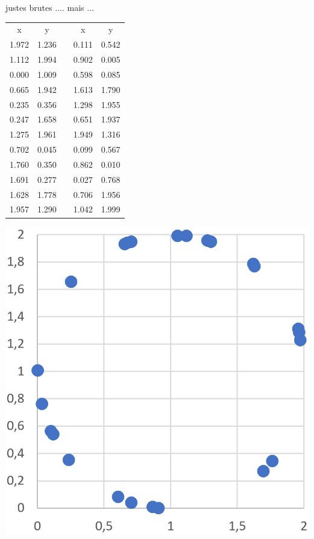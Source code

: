 \documentclass[french]{beamer}
\begin{document}
 \begin{frame}{justes brutes .... mais ... }
\begin{minipage}{.49\textwidth}
\begin{center}
	\begin{tabular}{|cc|c|cc|}
		x & y  &  & x & y \\ 
		1.972&1.236&&0.111&0.542 \\
		1.112&1.994&&0.902&0.005 \\
		0.000&1.009&&0.598&0.085 \\
		0.665&1.942&&1.613&1.790 \\
		0.235&0.356&&1.298&1.955 \\
		0.247&1.658&&0.651&1.937 \\
		1.275&1.961&&1.949&1.316 \\
		0.702&0.045&&0.099&0.567 \\
		1.760&0.350&&0.862&0.010 \\
		1.691&0.277&&0.027&0.768 \\
		1.628&1.778&&0.706&1.956 \\
		1.957&1.290&&1.042&1.999 \\
	\end{tabular} 
\end{center}
\end{minipage}\hfill
\begin{minipage}{.45\textwidth}
	\begin{center}
	\includegraphics[width=\textwidth]{circle}
	\end{center}
\end{minipage}
\end{frame}
\end{document}
